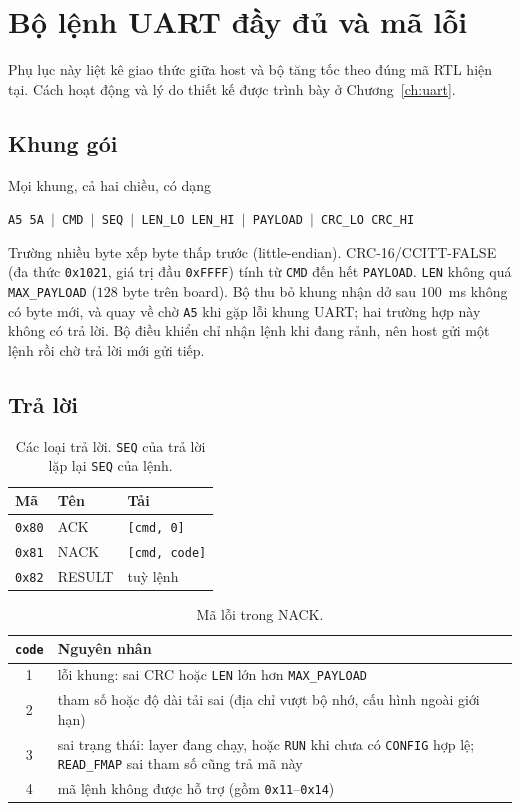 \chapter{Bộ lệnh UART đầy đủ và mã lỗi}\label{pl:bolenh}
Phụ lục này liệt kê giao thức giữa host và bộ tăng tốc theo đúng mã RTL hiện tại.
Cách hoạt động và lý do thiết kế được trình bày ở Chương~\ref{ch:uart}.

\section*{Khung gói}
Mọi khung, cả hai chiều, có dạng
\begin{center}
\texttt{A5 5A $|$ CMD $|$ SEQ $|$ LEN\_LO LEN\_HI $|$ PAYLOAD $|$ CRC\_LO CRC\_HI}
\end{center}
Trường nhiều byte xếp byte thấp trước (little-endian).
CRC-16/CCITT-FALSE (đa thức \texttt{0x1021}, giá trị đầu \texttt{0xFFFF}) tính từ \texttt{CMD} đến hết \texttt{PAYLOAD}.
\texttt{LEN} không quá \texttt{MAX\_PAYLOAD} ($128$ byte trên board).
Bộ thu bỏ khung nhận dở sau $100$~ms không có byte mới, và quay về chờ \texttt{A5} khi gặp lỗi khung UART; hai trường hợp này không có trả lời.
Bộ điều khiển chỉ nhận lệnh khi đang rảnh, nên host gửi một lệnh rồi chờ trả lời mới gửi tiếp.

\section*{Trả lời}
\begin{table}[H]\centering
\caption{Các loại trả lời. \texttt{SEQ} của trả lời lặp lại \texttt{SEQ} của lệnh.}\label{tab:pl-traloi}
\small\setlength{\tabcolsep}{5pt}
\begin{tabular}{@{}lll@{}}
\toprule
Mã & Tên & Tải \\ \midrule
\texttt{0x80} & ACK & \texttt{[cmd, 0]} \\
\texttt{0x81} & NACK & \texttt{[cmd, code]} \\
\texttt{0x82} & RESULT & tuỳ lệnh \\ \bottomrule
\end{tabular}
\end{table}

\begin{table}[H]\centering
\caption{Mã lỗi trong NACK.}\label{tab:pl-nack}
\small\setlength{\tabcolsep}{5pt}
\begin{tabular}{@{}c>{\raggedright\arraybackslash}p{12.5cm}@{}}
\toprule
\texttt{code} & Nguyên nhân \\ \midrule
1 & lỗi khung: sai CRC hoặc \texttt{LEN} lớn hơn \texttt{MAX\_PAYLOAD} \\
2 & tham số hoặc độ dài tải sai (địa chỉ vượt bộ nhớ, cấu hình ngoài giới hạn) \\
3 & sai trạng thái: layer đang chạy, hoặc \texttt{RUN} khi chưa có \texttt{CONFIG} hợp lệ; \texttt{READ\_FMAP} sai tham số cũng trả mã này \\
4 & mã lệnh không được hỗ trợ (gồm \texttt{0x11}--\texttt{0x14}) \\ \bottomrule
\end{tabular}
\end{table}

